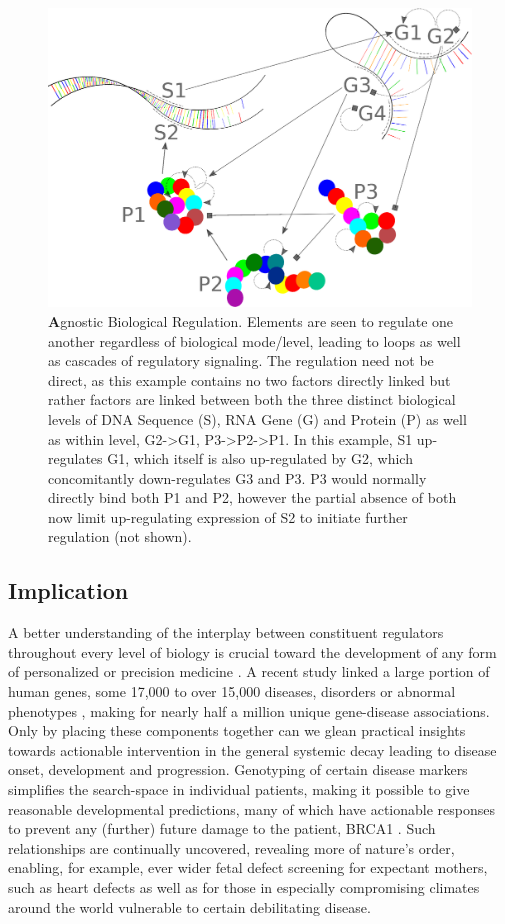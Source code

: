 \begin{figure}%
\centering
\includegraphics[width=1\linewidth]{2/DNA2.eps}
\caption{{\textbf Agnostic Biological Regulation.} Elements are seen to regulate one another regardless of biological mode/level, leading to loops as well as cascades of regulatory signaling. The regulation need not be direct, as this example contains no two factors directly linked but rather factors are linked between both the three distinct biological levels of DNA Sequence (S), RNA Gene (G) and Protein (P) as well as within level, \ie G2->G1, P3->P2->P1. In this example, S1 up-regulates G1, which itself is also up-regulated by G2, which concomitantly down-regulates G3 and P3. P3 would normally directly bind both P1 and P2, however the partial absence of both now limit up-regulating expression of S2 to initiate further regulation (not shown).
}
\label{fig:DNA}
\end{figure}


\subsection{Implication}
\label{sec:practical}
A better understanding of the interplay between constituent regulators throughout every level of biology is crucial toward the development of any form of personalized or precision medicine \citep{barabasi2011network}. A recent study linked a large portion of human genes, some 17,000 to over 15,000 diseases, disorders or abnormal phenotypes \citep{pinero2015disgenet}, making for nearly half a million unique gene-disease associations. Only by placing these components together can we glean practical insights towards actionable intervention in the general systemic decay leading to disease onset, development and progression. Genotyping of certain disease markers simplifies the search-space in individual patients, making it possible to give reasonable developmental predictions, many of which have actionable responses to prevent any (further) future damage to the patient, \eg BRCA1 \citep{lerman1996brca1}. Such relationships are continually uncovered, revealing more of nature's order, enabling, for example, ever wider fetal defect screening for expectant mothers, such as heart defects \citep{hyett1999using} as well as for those in especially compromising climates around the world vulnerable to certain debilitating disease.

